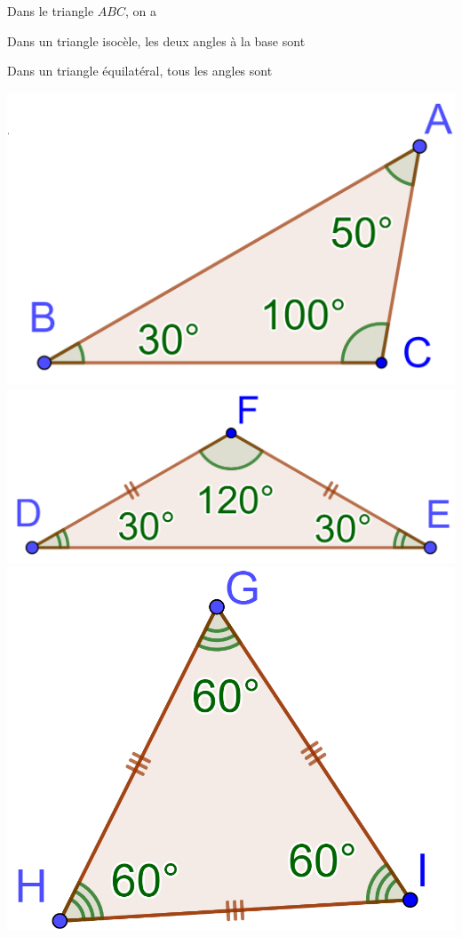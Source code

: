 \documentclass[12pt,a4paper]{article}
\begin{document}
\begin{myexs}
	\begin{multicols}{2}
		\vspace*{1cm}
		Dans le triangle $ABC$, on a \\ %
		\vspace*{1cm}
		
		
		Dans un triangle isocèle, les deux angles à la base sont %
		\vspace*{2.5cm}
		
		
		Dans un triangle équilatéral, tous les angles sont %
		
		\begin{center}	
			\includegraphics[scale=0.18]{quelconque}	
			\includegraphics[scale=0.18]{isocele}	
			\includegraphics[scale=0.18]{equilateral}

\end{center}
\end{multicols}
\end{myexs}
\end{document}
